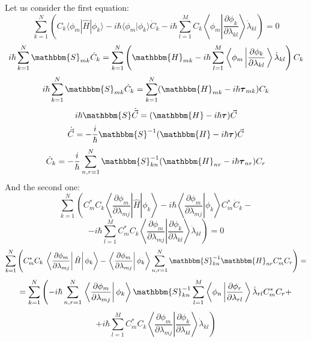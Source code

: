 Let us consider the first equation:
$$\sum_{k=1}^N \left(C_k\langle\phi_m|\hat{H}|\phi_k\rangle - %
	       i\hbar\langle\phi_m|\phi_k\rangle \dot{C}_k - %
	       i\hbar\sum_{l=1}^MC_k\left\langle\phi_m\left|\frac{\partial\phi_k}{\partial\lambda_{kl}}\right.\right\rangle\dot{\lambda}_{kl}\right)=0$$
$$i\hbar\sum_{k=1}^N\mathbbm{S}_{mk}\dot{C}_k=\sum_{k=1}^N\left(\mathbbm{H}_{mk}-%
							  i\hbar\sum_{l=1}^M\left\langle\phi_m\left|\frac{\partial\phi_k}{\partial\lambda_{kl}}\right.\right\rangle\dot{\lambda}_{kl}\right)C_k$$
$$i\hbar\sum_{k=1}^N\mathbbm{S}_{mk}\dot{C}_k=\sum_{k=1}^N(\mathbbm{H}_{mk}-i\hbar\boldsymbol{\tau}_{mk})C_k$$
$$i\hbar\mathbbm{S}\dot{\vec{C}}=(\mathbbm{H}-i\hbar\boldsymbol{\tau})\vec{C}$$
$$\dot{\vec{C}} = -\frac{i}{\hbar}\mathbbm{S}^{-1}(\mathbbm{H}-i\hbar\boldsymbol{\tau})\vec{C}$$
$$\dot{C}_k = -\frac{i}{\hbar}\sum_{n,r=1}^N \mathbbm{S}^{-1}_{kn}(\mathbbm{H}_{nr}-i\hbar\boldsymbol{\tau}_{nr})C_r$$
And the second one:
$$\sum_{k=1}^N\left.\left.\left(C_m^*C_k\left\langle\frac{\partial\phi_m}{\partial\lambda_{mj}}\right|\hat{H}\right|\phi_k\right\rangle-%
	     i\hbar\left.\left\langle\frac{\partial\phi_m}{\partial\lambda_{mj}}\right|\phi_k\right\rangle C_m^*\dot{C}_k-\right.$$
$$\left.    -i\hbar\sum_{l=1}^MC_m^*C_k\left\langle\frac{\partial\phi_m}{\partial\lambda_{mj}}\left|\frac{\partial\phi_k}{\partial\lambda_{kl}}\right.\right\rangle\dot{\lambda}_{kl}\right)=0$$
$$\sum_{k=1}^N\left(C_m^*C_k\left.\left.\left\langle\frac{\partial\phi_m}{\partial\lambda_{mj}}\right|\hat{H}\right|\phi_k\right\rangle-%
		    \left.\left\langle\frac{\partial\phi_m}{\partial\lambda_{mj}}\right|\phi_k\right\rangle\sum_{n,r=1}^N\mathbbm{S}^{-1}_{kn}\mathbbm{H}_{nr}C_m^*C_r\right)=$$
$$= \sum_{k=1}^N\left(-i\hbar\sum_{n,r=1}^N\left.\left\langle\frac{\partial\phi_m}{\partial\lambda_{mj}}\right|\phi_k\right\rangle\mathbbm{S}_{kn}^{-1}%
		             \sum_{l=1}^M\left\langle\phi_n\left|\frac{\partial\phi_r}{\partial\lambda_{rl}}\right.\right\rangle\dot{\lambda}_{rl}C_m^*C_r+\right.$$
$$\left.     +i\hbar\sum_{l=1}^MC_m^*C_k\left\langle\frac{\partial\phi_m}{\partial\lambda_{mj}}\left|\frac{\partial\phi_k}{\partial\lambda_{kl}}\right.\right\rangle\dot{\lambda}_{kl}\right)$$

